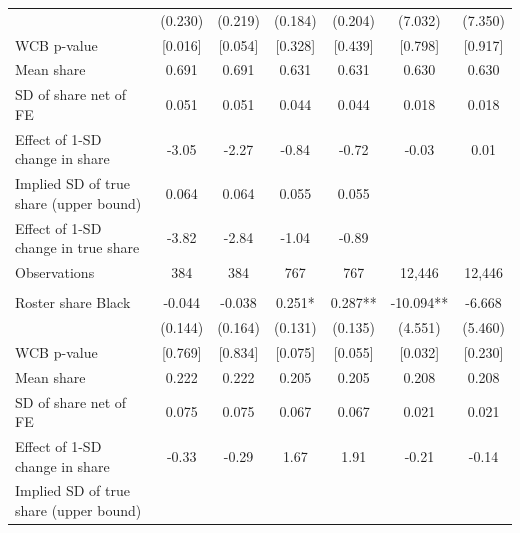 \begin{table}[H]
{\begin{tabular}[t]{lcccccc}
\hspace{1em} & (0.230) & (0.219) & (0.184) & (0.204) & (7.032) & (7.350)\\
\hspace{1em}WCB p-value & {}[0.016] & {}[0.054] & {}[0.328] & {}[0.439] & {}[0.798] & {}[0.917]\\
\hspace{1em}Mean share & 0.691 & 0.691 & 0.631 & 0.631 & 0.630 & 0.630\\
\hspace{1em}SD of share net of FE & 0.051 & 0.051 & 0.044 & 0.044 & 0.018 & 0.018\\
\hspace{1em}Effect of 1-SD change in share & -3.05 & -2.27 & -0.84 & -0.72 & -0.03 & 0.01\\
\hspace{1em}Implied SD of true share (upper bound) & 0.064 & 0.064 & 0.055 & 0.055 &  & \\
\hspace{1em}Effect of 1-SD change in true share & -3.82 & -2.84 & -1.04 & -0.89 &  & \\
\hspace{1em}Observations & 384 & 384 & 767 & 767 & 12,446 & \vphantom{4} 12,446\\
\addlinespace[0pt]
\multicolumn{7}{l}{\textbf{Panel C: Provisional (Wikipedia category flag)}}\\
\hspace{1em}Roster share Black & -0.044 & -0.038 & 0.251* & 0.287** & -10.094** & -6.668\\
\hspace{1em} & (0.144) & (0.164) & (0.131) & (0.135) & (4.551) & (5.460)\\
\hspace{1em}WCB p-value & {}[0.769] & {}[0.834] & {}[0.075] & {}[0.055] & {}[0.032] & {}[0.230]\\
\hspace{1em}Mean share & 0.222 & 0.222 & 0.205 & 0.205 & 0.208 & 0.208\\
\hspace{1em}SD of share net of FE & 0.075 & 0.075 & 0.067 & 0.067 & 0.021 & 0.021\\
\hspace{1em}Effect of 1-SD change in share & -0.33 & -0.29 & 1.67 & 1.91 & -0.21 & -0.14\\
\hspace{1em}Implied SD of true share (upper bound) &  &  &  &  &  \vphantom{3} & \\

\end{tabular}}
\end{table}
